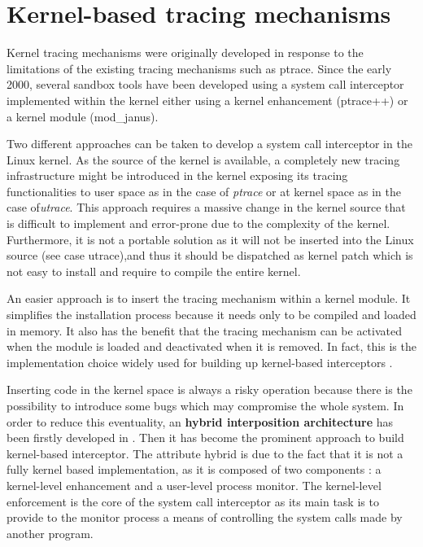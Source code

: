 \chapter{Kernel-based tracing mechanisms}
\label{kernel_mode}

Kernel tracing mechanisms were originally developed in response to the limitations of the existing tracing mechanisms such as ptrace. Since the early 2000, several sandbox tools have been developed using a system call interceptor implemented within the kernel \cite{Janus,Noordende_asecure,Provos02improvinghost,Garfinkel03ostia:a} either using a kernel enhancement (ptrace++) or a kernel module (mod\_janus).

Two different approaches can be taken to develop a system call interceptor in the Linux kernel. As the source of the kernel is available, a completely new tracing infrastructure might be introduced in the kernel exposing its tracing functionalities to user space as in the case of \textit{ptrace} or at kernel space as in the case of\textit{utrace}. This approach requires a massive change in the kernel source that is difficult to implement and error-prone due to the complexity of the kernel. Furthermore, it is not a portable solution as it will not be inserted into the Linux source (see case utrace),and thus it should be dispatched as kernel patch which is not easy to install and require to compile the entire kernel. 

An easier approach is to insert the tracing mechanism within a kernel module. It simplifies the installation process because it needs only to be compiled and loaded in memory. It also has the benefit that the tracing mechanism can be activated when the module is loaded and deactivated when it is removed. In fact, this is the implementation choice widely used for building up  kernel-based interceptors \cite{Janus,Noordende_asecure,Provos02improvinghost}. 


Inserting code in the kernel space is always a risky operation because there is the possibility to introduce some bugs which may compromise the whole system. In order to reduce this eventuality, an \textbf{hybrid interposition architecture} has been firstly developed in \cite{Janus}. Then it has become the prominent approach to build kernel-based interceptor. The attribute hybrid is due to the fact that it is not a fully kernel based implementation, as it is composed of two components : a kernel-level enhancement and a user-level process monitor. The kernel-level enforcement is the core of the system call interceptor as its main task is to provide to the monitor process a means of controlling the system calls made by another program. 


